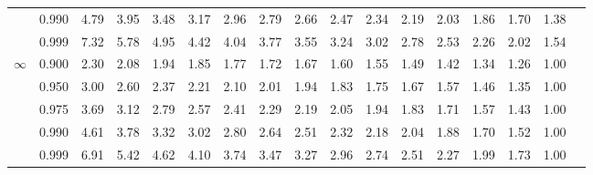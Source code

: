 {\begin{center}
\begin{tabular}{rrr@{\,}r@{\,}r@{\,}r@{\,}r@{\,}r@{\,}r@{\,}r
                   @{\,}r@{\,}r@{\,}r@{\,}r@{\,}r@{\,}r@{\,}r}
  &0.990&4.79&3.95&3.48&3.17&2.96&2.79&2.66&2.47&2.34&2.19&2.03&1.86&1.70&1.38\\
  &0.999&7.32&5.78&4.95&4.42&4.04&3.77&3.55&3.24&3.02&2.78&2.53&2.26&2.02&1.54\\
$\infty$
  &0.900&2.30&2.08&1.94&1.85&1.77&1.72&1.67&1.60&1.55&1.49&1.42&1.34&1.26&1.00\\
  &0.950&3.00&2.60&2.37&2.21&2.10&2.01&1.94&1.83&1.75&1.67&1.57&1.46&1.35&1.00\\
  &0.975&3.69&3.12&2.79&2.57&2.41&2.29&2.19&2.05&1.94&1.83&1.71&1.57&1.43&1.00\\
  &0.990&4.61&3.78&3.32&3.02&2.80&2.64&2.51&2.32&2.18&2.04&1.88&1.70&1.52&1.00\\
  &0.999&6.91&5.42&4.62&4.10&3.74&3.47&3.27&2.96&2.74&2.51&2.27&1.99&1.73&1.00
\end{tabular}
\end{center}



} %

